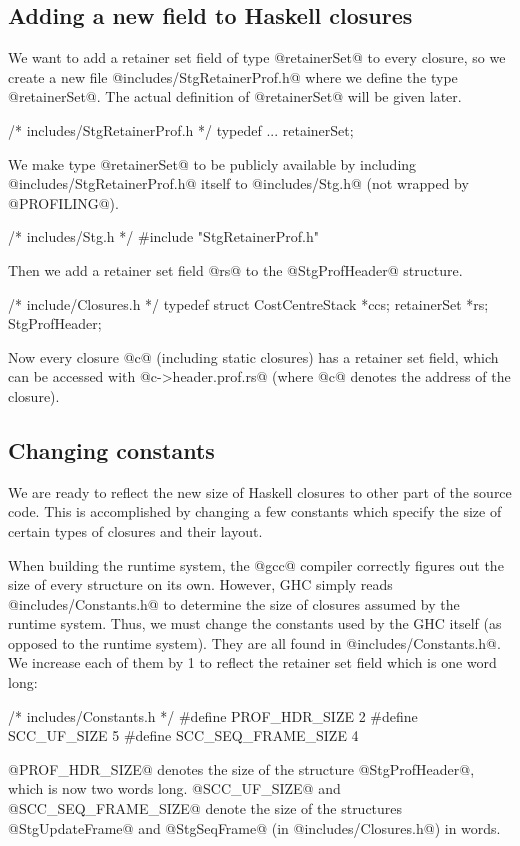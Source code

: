 \documentclass{article}
\begin{document}
\subsection{Adding a new field to Haskell closures} 

We want to add a retainer set field of type @retainerSet@ to every 
closure, so we create a new file @includes/StgRetainerProf.h@ where
we define the type @retainerSet@.
The actual definition of @retainerSet@ will be given later.

\begin{code}
/* includes/StgRetainerProf.h */
typedef ... retainerSet;
\end{code}

We make type @retainerSet@ to be publicly available by including
@includes/StgRetainerProf.h@ itself to @includes/Stg.h@ (not wrapped
by @PROFILING@).

\begin{code}
/* includes/Stg.h */
#include "StgRetainerProf.h"
\end{code}

Then we add a retainer set field @rs@ to the @StgProfHeader@ structure.

\begin{code}
/* include/Closures.h */
typedef struct {
   CostCentreStack *ccs;
   retainerSet *rs;
} StgProfHeader;
\end{code}

Now every closure @c@ (including static closures) has a retainer set field,
which can be accessed with @c->header.prof.rs@ (where @c@ denotes the 
address of the closure).

\subsection{Changing constants}

We are ready to reflect the new size of Haskell closures to other part
of the source code.
This is accomplished by changing a few constants which specify the size
of certain types of closures and their layout.

When building the runtime system, the @gcc@ compiler correctly figures out
the size of every structure on its own.
However, 
GHC simply reads @includes/Constants.h@ to determine the size of 
closures assumed by the runtime system.
Thus, we must change the constants used by the GHC itself (as opposed to
the runtime system). They are all found in @includes/Constants.h@.
We increase each of them by 1 to reflect the retainer set field which is one 
word long:
\begin{code}
/* includes/Constants.h */
#define PROF_HDR_SIZE       2
#define SCC_UF_SIZE         5
#define SCC_SEQ_FRAME_SIZE  4
\end{code}
@PROF_HDR_SIZE@ denotes the size of the structure @StgProfHeader@, which
is now two words long. 
@SCC_UF_SIZE@ and @SCC_SEQ_FRAME_SIZE@ denote the size of the structures
@StgUpdateFrame@ and @StgSeqFrame@ (in @includes/Closures.h@) in
words.
\end{document}
